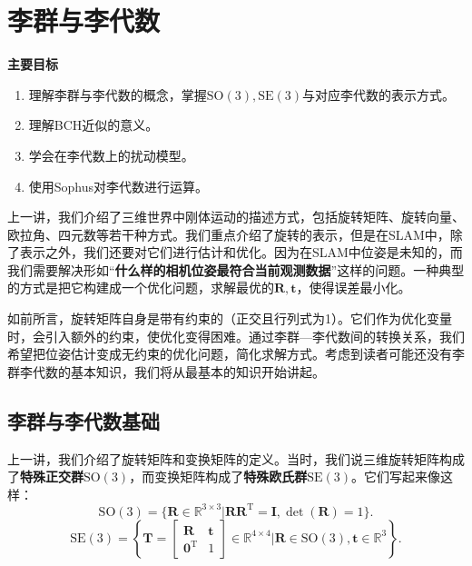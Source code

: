 \chapter{李群与李代数}

\begin{mdframed}  
	\textbf{主要目标}
	\begin{enumerate}[labelindent=0em,leftmargin=1.5em]
		\item 理解李群与李代数的概念，掌握$\mathrm{SO}(3), \mathrm{SE}(3)$与对应李代数的表示方式。
		\item 理解BCH近似的意义。
		\item 学会在李代数上的扰动模型。
		\item 使用Sophus对李代数进行运算。
	\end{enumerate}
\end{mdframed} 

上一讲，我们介绍了三维世界中刚体运动的描述方式，包括旋转矩阵、旋转向量、欧拉角、四元数等若干种方式。我们重点介绍了旋转的表示，但是在SLAM中，除了表示之外，我们还要对它们进行估计和优化。因为在SLAM中位姿是未知的，而我们需要解决形如“\textbf{什么样的相机位姿最符合当前观测数据}”这样的问题。一种典型的方式是把它构建成一个优化问题，求解最优的$\bm{R}, \bm{t}$，使得误差最小化。

如前所言，旋转矩阵自身是带有约束的（正交且行列式为1）。它们作为优化变量时，会引入额外的约束，使优化变得困难。通过李群—李代数间的转换关系，我们希望把位姿估计变成无约束的优化问题，简化求解方式。考虑到读者可能还没有李群李代数的基本知识，我们将从最基本的知识开始讲起。
\newpage


\newpage 
\section{李群与李代数基础}
上一讲，我们介绍了旋转矩阵和变换矩阵的定义。当时，我们说三维旋转矩阵构成了\textbf{特殊正交群}$\mathrm{SO}(3)$，而变换矩阵构成了\textbf{特殊欧氏群}$\mathrm{SE}(3)$。它们写起来像这样：
\begin{equation}
\mathrm{SO}(3) = \{ \bm{R} \in \mathbb{R}^{3 \times 3} | \bm{R R}^\mathrm{T} = \bm{I}, \det(\bm{R})=1 \}.
\end{equation}
\begin{equation}
\mathrm{SE}(3) = \left\{ \bm{T} = \left[ {\begin{array}{*{20}{c}}
	\bm{R} & \bm{t} \\
	{{\bm{0}^\mathrm{T}}} & 1
	\end{array}} \right]
\in \mathbb{R}^{4 \times 4} | \bm{R} \in \mathrm{SO}(3), \bm{t} \in \mathbb{R}^3\right\}.
\end{equation}

